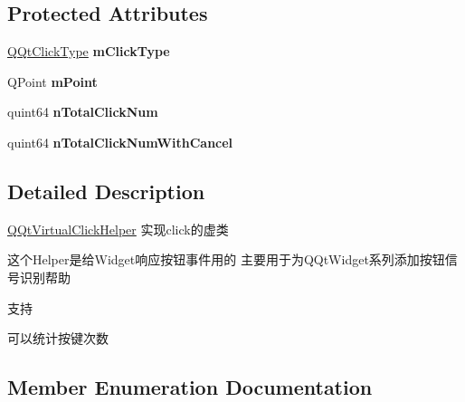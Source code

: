 \subsection*{Protected Attributes}
\begin{DoxyCompactItemize}
\item 
\mbox{\label{class_q_qt_virtual_click_helper_ac2b4f2aef56b010245f3817b22a35050}} 
\mbox{\hyperlink{class_q_qt_virtual_click_helper_ace6c0c9b072e51f2cb3ff1316404b764}{Q\+Qt\+Click\+Type}} {\bfseries m\+Click\+Type}
\item 
\mbox{\label{class_q_qt_virtual_click_helper_a38cbbaa7cb39983a6c168b82fba748ce}} 
Q\+Point {\bfseries m\+Point}
\item 
\mbox{\label{class_q_qt_virtual_click_helper_ac42baebe0a09b3060fa3a909fc762f8e}} 
quint64 {\bfseries n\+Total\+Click\+Num}
\item 
\mbox{\label{class_q_qt_virtual_click_helper_ad090d0c33ac38f1f058660d87f49e574}} 
quint64 {\bfseries n\+Total\+Click\+Num\+With\+Cancel}
\end{DoxyCompactItemize}


\subsection{Detailed Description}
\mbox{\hyperlink{class_q_qt_virtual_click_helper}{Q\+Qt\+Virtual\+Click\+Helper}} 实现click的虚类

这个\+Helper是给\+Widget响应按钮事件用的 主要用于为\+Q\+Qt\+Widget系列添加按钮信号识别帮助

支持

可以统计按键次数 

\subsection{Member Enumeration Documentation}
\mbox{\label{class_q_qt_virtual_click_helper_ace6c0c9b072e51f2cb3ff1316404b764}} 

